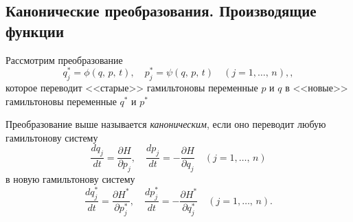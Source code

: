 \documentclass[a4paper]{article}
\begin{document}
\subsection{Канонические преобразования. Производящие функции}
\label{subsec:tr}
Рассмотрим преобразование
\[
	q^*_j=\phi(q,\,p,\,t),\quad p^*_j=\psi(q,\,p,\,t)\quad (j=1,\ldots,\,n),
,\] 
которое переводит <<старые>> гамильтоновы переменные $p$ и $q$ в
<<новые>> гамильтоновы переменные $q^*$ и $p^*$ 
\begin{dfn}
	Преобразование выше  называется \emph{каноническим}, если оно переводит
	любую гамильтонову систему
	\[
	\frac{dq_j}{dt}=\frac{\partial H}{\partial p_j} , \quad
	\frac{dp_j}{dt}=-\frac{\partial H}{\partial q_j}  \quad
	(j=1,\ldots,\,n)
\]
в новую гамильтонову систему
\[
\frac{dq^*_j}{dt}=\frac{\partial H^*}{\partial p^*_j} ,\quad
\frac{dp^*_j}{dt}=-\frac{\partial H^*}{\partial q^*_j} \quad
(j=1,\ldots,\,n)
.\] 
\end{dfn}
\end{document}
